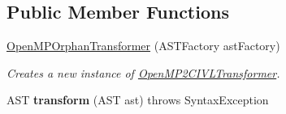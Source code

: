 \subsection*{Public Member Functions}
\begin{DoxyCompactItemize}
\item 
\hyperlink{classedu_1_1udel_1_1cis_1_1vsl_1_1civl_1_1transform_1_1IF_1_1OpenMPOrphanTransformer_aff5aba12d455dfc5e27fb7d4c5c79da0}{Open\+M\+P\+Orphan\+Transformer} (A\+S\+T\+Factory ast\+Factory)
\begin{DoxyCompactList}\small\item\em Creates a new instance of \hyperlink{classedu_1_1udel_1_1cis_1_1vsl_1_1civl_1_1transform_1_1IF_1_1OpenMP2CIVLTransformer}{Open\+M\+P2\+C\+I\+V\+L\+Transformer}. \end{DoxyCompactList}\item 
\hypertarget{classedu_1_1udel_1_1cis_1_1vsl_1_1civl_1_1transform_1_1IF_1_1OpenMPOrphanTransformer_a8a3b82d79aa1dc61c308455215fbf3c6}{}A\+S\+T {\bfseries transform} (A\+S\+T ast)  throws Syntax\+Exception \label{classedu_1_1udel_1_1cis_1_1vsl_1_1civl_1_1transform_1_1IF_1_1OpenMPOrphanTransformer_a8a3b82d79aa1dc61c308455215fbf3c6}

\end{DoxyCompactItemize}

